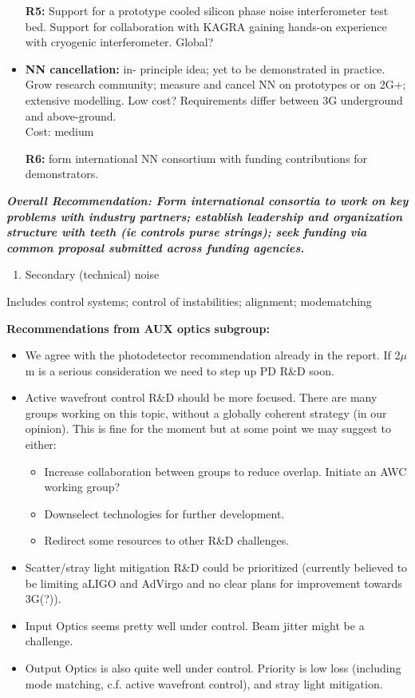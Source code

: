 \begin{itemize}
\textbf{R5:} Support for a prototype cooled silicon phase noise interferometer test bed. Support for collaboration with KAGRA gaining hands-on experience with cryogenic interferometer. Global?


\item \noindent \textbf{NN cancellation: } in- principle idea; yet to be demonstrated in practice. Grow research community; measure and cancel NN on prototypes or on 2G+; extensive modelling. Low cost? Requirements differ between 3G underground and above-ground. \\     
Cost:  medium

\textbf{R6:}  form international NN consortium with funding contributions for  demonstrators.

\end{itemize}


\noindent \textbf{\textit{Overall Recommendation:  Form international consortia to work on key problems with industry partners; establish leadership and organization structure with teeth (ie controls purse strings); seek funding via common proposal submitted across funding agencies.}}

\noindent \textbf{\textit{}}

\begin{enumerate}
\item \textbf{\textit{ }} Secondary (technical) noise
\end{enumerate}

\noindent Includes control systems; control of instabilities; alignment; modematching

{\bf Recommendations from AUX optics subgroup:}
\begin{itemize}
\item We agree with the photodetector recommendation already in the report. If 2$\mu$m is a serious consideration we need to step up PD R\&D soon.
\item Active wavefront control R\&D should be more focused. There are many groups working on this topic, without a globally coherent strategy (in our opinion). This is fine for the moment but at some point we may suggest to either: \begin{itemize}
\item Increase collaboration between groups to reduce overlap. Initiate an AWC working group? 
\item Downselect technologies for further development. 
\item Redirect some resources to other R\&D challenges.
\end{itemize}
\item Scatter/stray light mitigation R\&D could be prioritized (currently believed to be limiting aLIGO and AdVirgo and no clear plans for improvement towards 3G(?)).
\item Input Optics seems pretty well under control. Beam jitter might be a challenge.
\item Output Optics is also quite well under control. Priority is low loss (including mode matching, c.f. active wavefront control), and stray light mitigation.
\end{itemize}


